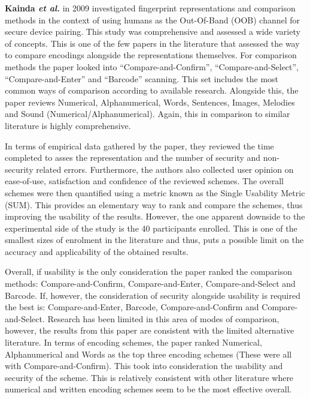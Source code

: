 \textbf{Kainda \textit{et al.}}\cite{kainda2009usability} in 2009 investigated fingerprint representations and comparison methods in the context of using humans as the Out-Of-Band (OOB) channel for secure device pairing. This study was comprehensive and assessed a wide variety of concepts. This is one of the few papers in the literature that assessed the way to compare encodings alongside the representations themselves. For comparison methods the paper looked into ``Compare-and-Confirm'', ``Compare-and-Select'', ``Compare-and-Enter'' and ``Barcode'' scanning. This set includes the most common ways of comparison according to available research. Alongside this, the paper reviews Numerical, Alphanumerical, Words, Sentences, Images, Melodies and Sound (Numerical/Alphanumerical). Again, this in comparison to similar literature is highly comprehensive.

In terms of empirical data gathered by the paper, they reviewed the time completed to asses the representation and the number of security and non-security related errors. Furthermore, the authors also collected user opinion on ease-of-use, satisfaction and confidence of the reviewed schemes. The overall schemes were then quantified using a metric known as the Single Usability Metric (SUM)\cite{sauro2005method}. This provides an elementary way to rank and compare the schemes, thus improving the usability of the results. 
However, the one apparent downside to the experimental side of the study is the 40 participants enrolled. This is one of the smallest sizes of enrolment in the literature and thus, puts a possible limit on the accuracy and applicability of the obtained results. 

Overall, if usability is the only consideration the paper ranked the comparison methods: Compare-and-Confirm, Compare-and-Enter, Compare-and-Select and Barcode. If, however, the consideration of security alongside usability is required the best is: Compare-and-Enter, Barcode, Compare-and-Confirm and Compare-and-Select. Research has been limited in this area of modes of comparison, however, the results from this paper are consistent with the limited alternative literature. In terms of encoding schemes, the paper ranked Numerical, Alphanumerical and Words as the top three encoding schemes (These were all with Compare-and-Confirm). This took into consideration the usability and security of the scheme. This is relatively consistent with other literature where numerical and written encoding schemes seem to be the most effective overall.

